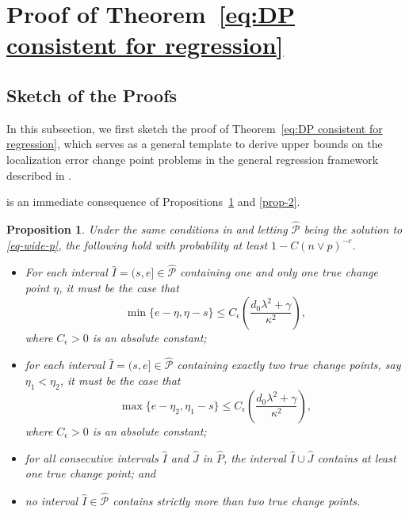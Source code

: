 \documentclass[twoside]{article}
\newtheorem{proposition}[theorem]{Proposition}
\begin{document}
\onecolumn
{}

\section{Proof of Theorem~\ref{eq:DP consistent for regression}}\label{app-pf1}

\subsection{Sketch of the Proofs}\label{sec-rm}


In this subsection, we first sketch the proof of Theorem~\ref{eq:DP consistent for regression}, which serves as a general template to derive upper bounds on the localization error change point problems in the general regression framework described in . 

 is an immediate consequence of Propositions~\ref{proposition:dp step 1} and \ref{prop-2}.


\begin{proposition}\label{proposition:dp step 1}
Under the same conditions in  and letting $\widehat{\mathcal{P}}$ being the solution to \eqref{eq-wide-p}, the following hold with probability at least $1 - C(n \vee p)^{-c}$. 
	\begin{itemize}
		\item [(i)] For each interval  $\widehat I = (s, e] \in \widehat{\mathcal{P}}$    containing one and only one true change point $\eta$, it must be the case that
			\[
				\min\{e - \eta, \eta - s\} \leq C_{\epsilon} \left(\frac{d_0 \lambda^2 + \gamma}{\kappa^2}\right),
			\]
			where $C_{\epsilon} > 0$ is an absolute constant;
		\item [(ii)] for each interval  $\widehat I = (s, e] \in \widehat{\mathcal{P}}$ containing exactly two true change points, say  $\eta_1 < \eta_2$, it must be the case that
			\[
				\max\{e - \eta_2, \eta_1 - s\} \leq C_{\epsilon} \left(\frac{d_0 \lambda^2 + \gamma}{\kappa^2}\right), 	
			\]  
			where $C_{\epsilon} > 0$ is an absolute constant;
		\item [(iii)] for all consecutive intervals $\widehat I$ and $\widehat {J}$ in $\widehat{P}$, the interval $\widehat I \cup \widehat{J}$ contains at least one true change point; and
		\item [(iv)] no interval $\widehat I \in \widehat{\mathcal{P}}$ contains strictly more than two true change points.
	 \end{itemize}
\end{proposition} 
\end{document}
